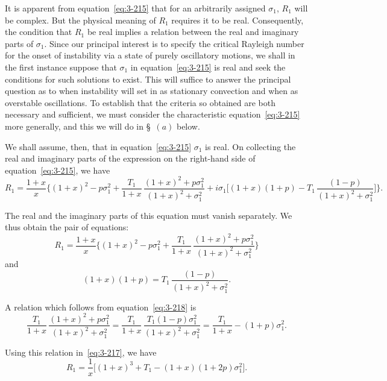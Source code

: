 It is apparent from equation~\eqref{eq:3-215} that for an arbitrarily assigned $\sigma_1$, $R_1$ will be complex. But the physical meaning of $R_1$ requires it to be real. Consequently, the condition that $R_1$ be real implies a relation between the real and imaginary parts of $\sigma_1$. Since our principal interest is to specify the critical Rayleigh number for the onset of instability via a state of purely oscillatory motions, we shall in the first instance suppose that $\sigma_1$ in equation~\eqref{eq:3-215} is real and seek the conditions for such solutions to exist. This will suffice to answer the principal question as to when instability will set in as stationary convection and when as overstable oscillations. To establish that the criteria so obtained are both necessary and sufficient, we must consider the characteristic equation~\eqref{eq:3-215} more generally, and this we will do in \S~$(a)$ below.

We shall assume, then, that in equation~\eqref{eq:3-215} $\sigma_1$ is real. On collecting the real and imaginary parts of the expression on the right-hand side of equation~\eqref{eq:3-215}, we have
\begin{equation}\label{eq:3-216}
R_1 = \frac{1+x}{x}\bigg\{(1+x)^2 - p\sigma_1^2 + \frac{T_1}{1+x}\,\frac{(1+x)^2 + p\sigma_1^2}{(1+x)^2 + \sigma_1^2} + i\sigma_1\bigg[(1+x)(1+p) - T_1\,\frac{(1-p)}{(1+x)^2 + \sigma_1^2}\bigg]\bigg\}.
\end{equation}

The real and the imaginary parts of this equation must vanish separately. We thus obtain the pair of equations:
\begin{equation}\label{eq:3-217}
R_1 = \frac{1+x}{x}\bigg\{(1+x)^2 - p\sigma_1^2 + \frac{T_1}{1+x}\,\frac{(1+x)^2 + p\sigma_1^2}{(1+x)^2 + \sigma_1^2}\bigg\}
\end{equation}
and
\begin{equation}\label{eq:3-218}
(1+x)(1+p) = T_1\,\frac{(1-p)}{(1+x)^2 + \sigma_1^2}.
\end{equation}

A relation which follows from equation~\eqref{eq:3-218} is
\begin{equation}\label{eq:3-219}
\frac{T_1}{1+x}\,\frac{(1+x)^2 + p\sigma_1^2}{(1+x)^2 + \sigma_1^2} = \frac{T_1}{1+x}\,\frac{T_1(1-p)\sigma_1^2}{(1+x)^2 + \sigma_1^2} = \frac{T_1}{1+x} - (1+p)\sigma_1^2.
\end{equation}

Using this relation in~\eqref{eq:3-217}, we have
\begin{equation}\label{eq:3-220}
R_1 = \frac{1}{x}\big[(1+x)^3 + T_1 - (1+x)(1+2p)\sigma_1^2\big].
\end{equation}

